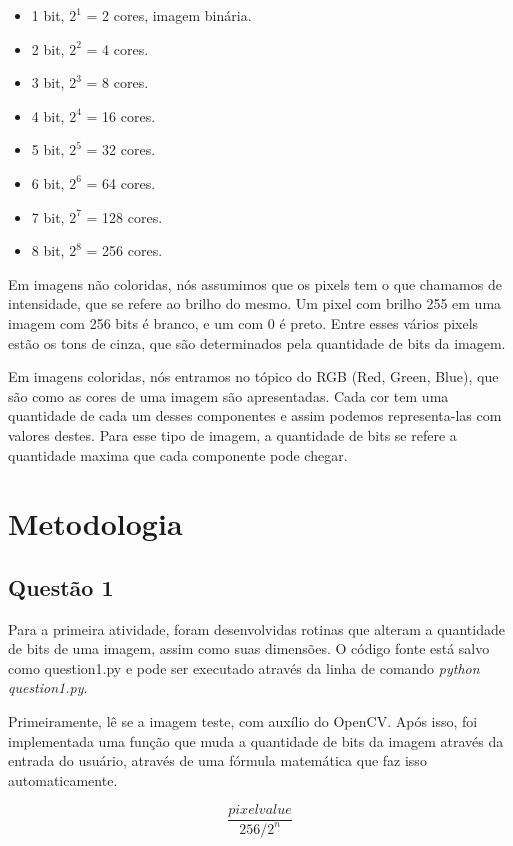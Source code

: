 \documentclass[conference]{IEEEtran}
\begin{document}
\begin{itemize}
\item 1 bit, $2^1$ = 2 cores, imagem binária.
\item 2 bit, $2^2$ = 4 cores.
\item 3 bit, $2^3$ = 8 cores.
\item 4 bit, $2^4$ = 16 cores.
\item 5 bit, $2^5$ = 32 cores.
\item 6 bit, $2^6$ = 64 cores.
\item 7 bit, $2^7$ = 128 cores.
\item 8 bit, $2^8$ = 256 cores.
\end{itemize}

Em imagens não coloridas, nós assumimos que os pixels tem 
o que chamamos de intensidade, que se refere ao brilho do mesmo.
Um pixel com brilho 255 em uma imagem com 256 bits é branco, e um com 0
é preto. Entre esses vários pixels estão os tons de cinza, que são determinados
pela quantidade de bits da imagem.

Em imagens coloridas, nós entramos no tópico do RGB (Red, Green, Blue), que
são como as cores de uma imagem são apresentadas. Cada cor tem uma quantidade
de cada um desses componentes e assim podemos representa-las com valores destes.
Para esse tipo de imagem, a quantidade de bits se refere a quantidade maxima que
cada componente pode chegar.

\section{Metodologia}
\subsection{Questão 1}

Para a primeira atividade, foram desenvolvidas rotinas que alteram a quantidade
de bits de uma imagem, assim como suas dimensões. O código fonte está salvo
como question1.py e pode ser executado através da linha de comando \textit{python question1.py}.


Primeiramente, lê se a imagem teste, com auxílio do OpenCV. Após isso, foi implementada
uma função que muda a quantidade de bits da imagem através da entrada do usuário,
através de uma fórmula matemática que faz isso automaticamente.

\begin{equation}
    \label{eq2}
    \frac{pixel value}{256/2^n}
\end{equation}
\end{document}
